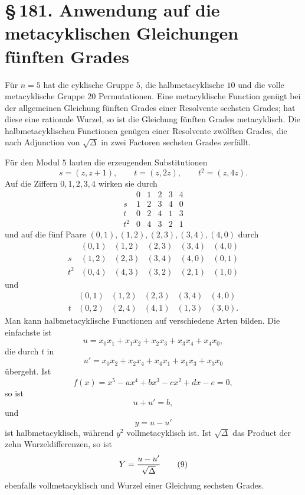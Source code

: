 \documentclass[11pt]{article}
\newcommand{\sect}[2]{\section*{\S\,#1. #2}}
\begin{document}
\sect{181}{Anwendung auf die metacyklischen Gleichungen fünften Grades}

Für $n=5$ hat die cyklische Gruppe $5$, die halbmetacyklische $10$ und die volle metacyklische Gruppe $20$ Permutationen. Eine metacyklische Function genügt bei der allgemeinen Gleichung fünften Grades einer Resolvente sechsten Grades; hat diese eine rationale Wurzel, so ist die Gleichung fünften Grades metacyklisch. Die halbmetacyklischen Functionen genügen einer Resolvente zwölften Grades, die nach Adjunction von $\sqrt\Delta$ in zwei Factoren sechsten Grades zerfällt.

Für den Modul $5$ lauten die erzeugenden Substitutionen
\[
  s=(z,z+1),\qquad t=(z,2z),\qquad t^2=(z,4z).
\]
Auf die Ziffern $0,1,2,3,4$ wirken sie durch
\[
\begin{array}{c|ccccc}
     &0&1&2&3&4\\ \hline
s    &1&2&3&4&0\\
t    &0&2&4&1&3\\
t^2  &0&4&3&2&1
\end{array}                                                       \tag{1}
\]
und auf die fünf Paare $(0,1),(1,2),(2,3),(3,4),(4,0)$ durch
\[
\begin{array}{c|ccccc}
      &(0,1)&(1,2)&(2,3)&(3,4)&(4,0)\\ \hline
s     &(1,2)&(2,3)&(3,4)&(4,0)&(0,1)\\
t^2   &(0,4)&(4,3)&(3,2)&(2,1)&(1,0)
\end{array}                                                       \tag{2}
\]
und
\[
\begin{array}{c|ccccc}
      &(0,1)&(1,2)&(2,3)&(3,4)&(4,0)\\ \hline
t     &(0,2)&(2,4)&(4,1)&(1,3)&(3,0).
\end{array}                                                       \tag{3}
\]
Man kann halbmetacyklische Functionen auf verschiedene Arten bilden. Die einfachste ist
\[
  u=x_0x_1+x_1x_2+x_2x_3+x_3x_4+x_4x_0,                         \tag{4}
\]
die durch $t$ in
\[
  u'=x_0x_2+x_2x_4+x_4x_1+x_1x_3+x_3x_0                          \tag{5}
\]
übergeht. Ist
\[
  f(x)=x^5-ax^4+bx^3-cx^2+dx-e=0,                                \tag{6}
\]
so ist
\[
  u+u'=b,                                                         \tag{7}
\]
und
\[
  y=u-u'                                                          \tag{8}
\]
ist halbmetacyklisch, während $y^2$ vollmetacyklisch ist. Ist $\sqrt\Delta$ das Product der zehn Wurzeldifferenzen, so ist
\[
  Y={u-u'\over\sqrt\Delta}                                       \tag{9}
\]
ebenfalls vollmetacyklisch und Wurzel einer Gleichung sechsten Grades.
\end{document}
